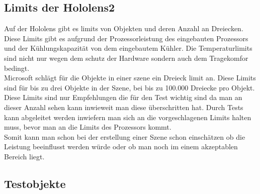 \subsection{Limits der Hololens2}\label{subsec:Limits der Hololens2}

    Auf der Hololens gibt es limits von Objekten und deren Anzahl an Dreiecken.
    Diese Limits gibt es aufgrund der Prozessorleistung des eingebauten Prozessors und der Kühlungskapazität von dem eingebautem Kühler.
    Die Temperaturlimits sind nicht nur wegen dem schutz der Hardware sondern auch dem Tragekomfor bedingt.\\
    Microsoft schlägt für die Objekte in einer szene ein Dreieck limit an. Diese Limits sind für bis zu drei Objekte in der Szene, bei bis zu 100.000\autocite{optimize_3d} Dreiecke pro Objekt.\\
    Diese Limits sind nur Empfehlungen die für den Test wichtig sind da man an dieser Anzahl sehen kann inwieweit man diese überschritten hat.
    Durch Tests kann abgeleitet werden inwiefern man sich an die vorgeschlagenen Limits halten muss, bevor man an die Limits des Prozessors kommt.\\
    Somit kann man schon bei der erstellung einer Szene schon einschätzen ob die Leistung beeinflusst werden würde oder ob man noch im einem akzeptablen Bereich liegt.



    \newpage

\subsection{Testobjekte}\label{subsec:Testobjekte}


